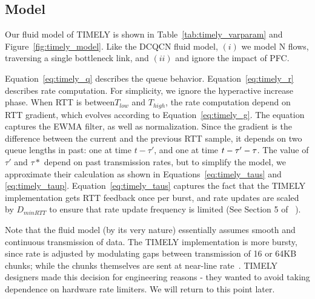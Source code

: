 \subsection{Model}

Our fluid model of TIMELY is shown in Table~\ref{tab:timely_varparam} and
Figure~\ref{fig:timely_model}. Like the DCQCN fluid model, $(i)$ we model N
flows, traversing a single bottleneck link, and $(ii)$ and ignore the impact of
PFC. 

Equation~\ref{eq:timely_q} describes the queue behavior.
Equation~\ref{eq:timely_r} describes rate computation. For simplicity, we ignore
the hyperactive increase phase. When RTT is between$T_{low}$ and $T_{high}$, the
rate computation depend on RTT gradient, which evolves according to
Equation~\ref{eq:timely_g}.  The equation captures the EWMA filter, as well as
normalization. Since the gradient is the difference between the current and the
previous RTT sample, it depends on two queue lengths in past: one at time $t -
\tau'$, and one at time $t - \tau'-\tau\*$. The value of $\tau'$ and $\tau*$
depend on past transmission rates, but to simplify the model, we approximate
their calculation as shown in Equations~\ref{eq:timely_taus} and
\ref{eq:timely_taup}.  Equation~\ref{eq:timely_taus} captures the fact that the
TIMELY implementation gets RTT feedback once per burst, and rate updates are
scaled by $D_{minRTT}$ to ensure that rate update frequency is limited (See
Section 5 of ~\cite{timely}).

Note that the fluid model (by its very nature) essentially assumes smooth and
continuous transmission of data. The TIMELY implementation is more bursty, since
rate is adjusted by modulating gaps between transmission of 16 or 64KB chunks;
while the chunks themselves are sent at near-line rate~\cite{timely-private}.
TIMELY designers made this decision for engineering reasons - they wanted to
avoid taking dependence on hardware rate limiters.  We will return to this point
later.

